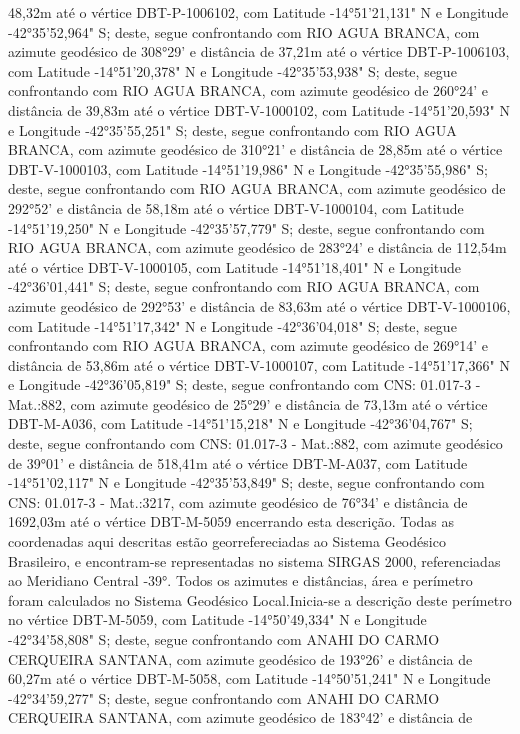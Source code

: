 48,32m  até o vértice DBT-P-1006102, com Latitude -14°51'21,131" N e Longitude -42°35'52,964" S; deste, segue confrontando com RIO AGUA BRANCA, com azimute geodésico de 308°29' e distância de 
37,21m  até o vértice DBT-P-1006103, com Latitude -14°51'20,378" N e Longitude -42°35'53,938" S; deste, segue confrontando com RIO AGUA BRANCA, com azimute geodésico de 260°24' e distância de 
39,83m  até o vértice DBT-V-1000102, com Latitude -14°51'20,593" N e Longitude -42°35'55,251" S; deste, segue confrontando com RIO AGUA BRANCA, com azimute geodésico de 310°21' e distância de 
28,85m  até o vértice DBT-V-1000103, com Latitude -14°51'19,986" N e Longitude -42°35'55,986" S; deste, segue confrontando com RIO AGUA BRANCA, com azimute geodésico de 292°52' e distância de 
58,18m  até o vértice DBT-V-1000104, com Latitude -14°51'19,250" N e Longitude -42°35'57,779" S; deste, segue confrontando com RIO AGUA BRANCA, com azimute geodésico de 283°24' e distância de 
112,54m  até o vértice DBT-V-1000105, com Latitude -14°51'18,401" N e Longitude -42°36'01,441" S; deste, segue confrontando com RIO AGUA BRANCA, com azimute geodésico de 292°53' e distância de 
83,63m  até o vértice DBT-V-1000106, com Latitude -14°51'17,342" N e Longitude -42°36'04,018" S; deste, segue confrontando com RIO AGUA BRANCA, com azimute geodésico de 269°14' e distância de 
53,86m  até o vértice DBT-V-1000107, com Latitude -14°51'17,366" N e Longitude -42°36'05,819" S; deste, segue confrontando com CNS: 01.017-3 - Mat.:882, com azimute geodésico de 25°29' e distância de 
73,13m  até o vértice DBT-M-A036, com Latitude -14°51'15,218" N e Longitude -42°36'04,767" S; deste, segue confrontando com CNS: 01.017-3 - Mat.:882, com azimute geodésico de 39°01' e distância de 
518,41m  até o vértice DBT-M-A037, com Latitude -14°51'02,117" N e Longitude -42°35'53,849" S; deste, segue confrontando com CNS: 01.017-3 - Mat.:3217, com azimute geodésico de 76°34' e distância de 
1692,03m  até o vértice DBT-M-5059 encerrando esta descrição. Todas as coordenadas aqui descritas estão georrefereciadas ao Sistema Geodésico Brasileiro, e encontram-se representadas no sistema SIRGAS 2000, referenciadas ao Meridiano Central -39°. Todos os azimutes e distâncias, área e perímetro foram calculados no Sistema Geodésico Local.Inicia-se a descrição deste perímetro no vértice DBT-M-5059, com Latitude -14°50'49,334" N e Longitude -42°34'58,808" S; deste, segue confrontando com ANAHI DO CARMO CERQUEIRA SANTANA, com azimute geodésico de 193°26' e distância de 60,27m até o vértice DBT-M-5058, com Latitude -14°50'51,241" N e Longitude -42°34'59,277" S; deste, segue confrontando com ANAHI DO CARMO CERQUEIRA SANTANA, com azimute geodésico de 183°42' e distância de 
